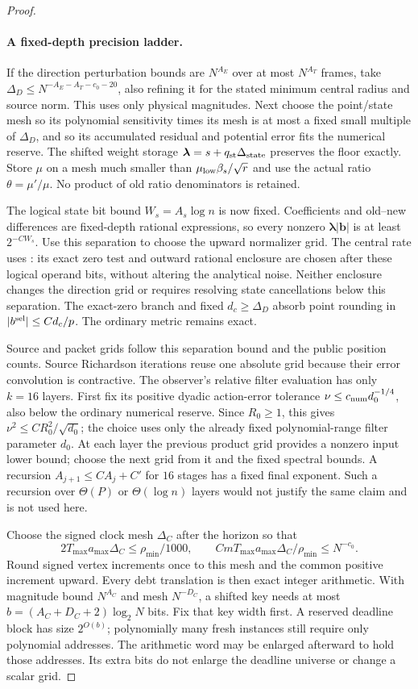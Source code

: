 \documentclass[11pt]{article}
\theoremstyle{remark}
\newcommand{\bb}{\mathbf b}
\newcommand{\llambda}{\boldsymbol{\lambda}}
\begin{document}
\begin{proof}
\paragraph{A fixed-depth precision ladder.}
If the direction perturbation bounds are $N^{A_E}$ over at most $N^{A_T}$
frames, take $\Delta_D\le N^{-A_E-A_T-c_0-20}$, also refining it for the stated
minimum central radius and source norm.
This uses only physical magnitudes.
Next choose the point/state mesh so its polynomial sensitivity times its mesh is
at most a fixed small multiple of $\Delta_D$, and so its accumulated residual
and potential error fits the numerical reserve.
The shifted weight storage $\llambda=s+q_{\rm st}\Delta_{\rm state}$ preserves the floor
exactly.
Store $\mu$ on a mesh much smaller than $\mu_{\rm low}\beta_s/\sqrt r$ and use
the actual ratio $\theta=\mu'/\mu$.
No product of old ratio denominators is retained.

The logical state bit bound $W_s=A_s\log n$ is now fixed.
Coefficients and old--new differences are fixed-depth rational expressions, so
every nonzero $\llambda|\bb|$ is at least $2^{-C W_s}$.
Use this separation to choose the upward normalizer grid.
The central rate uses : its exact zero
test and outward rational enclosure are chosen after these logical operand bits,
without altering the analytical noise.
Neither enclosure changes the direction grid or requires resolving state
cancellations below this separation.
The exact-zero branch and fixed $d_c\ge\Delta_D$ absorb point rounding in
$|b^{\rm sel}|\le Cd_c/p$.
The ordinary metric remains exact.

Source and packet grids follow this separation bound and the public position
counts.
Source Richardson iterations reuse one absolute grid because their error
convolution is contractive.
The observer's relative filter evaluation has only $k=16$ layers.
First fix its positive dyadic action-error tolerance $\nu\le c_{\rm
num}d_0^{-1/4}$, also below the ordinary numerical reserve.
Since $R_0\ge1$, this gives $\nu^2\le C R_0^2/\sqrt{d_0}$; the choice uses only
the already fixed polynomial-range filter parameter $d_0$.
At each layer the previous product grid provides a nonzero input lower bound;
choose the next grid from it and the fixed spectral bounds.
A recursion $A_{j+1}\le C A_j+C'$ for $16$ stages has a fixed final exponent.
Such a recursion over $\Theta(P)$ or $\Theta(\log n)$ layers would not justify the
same claim and is not used here.

Choose the signed clock mesh $\Delta_C$ after the horizon so that
\[
 2T_{\max}a_{\max}\Delta_C\le\rho_{\min}/1000,
 \qquad
 CmT_{\max}a_{\max}\Delta_C/\rho_{\min}\le N^{-c_0}.
\]
Round signed vertex increments once to this mesh and the common positive
increment upward.
Every debt translation is then exact integer arithmetic.
With magnitude bound $N^{A_C}$ and mesh $N^{-D_C}$, a shifted key needs at most
$b= (A_C+D_C+2)\log_2N $ bits.
Fix that key width first.
A reserved deadline block has size $2^{O(b)}$; polynomially many fresh instances
still require only polynomial addresses.
The arithmetic word may be enlarged afterward to hold those addresses.
Its extra bits do not enlarge the deadline universe or change a scalar grid.


\end{proof}
\end{document}
